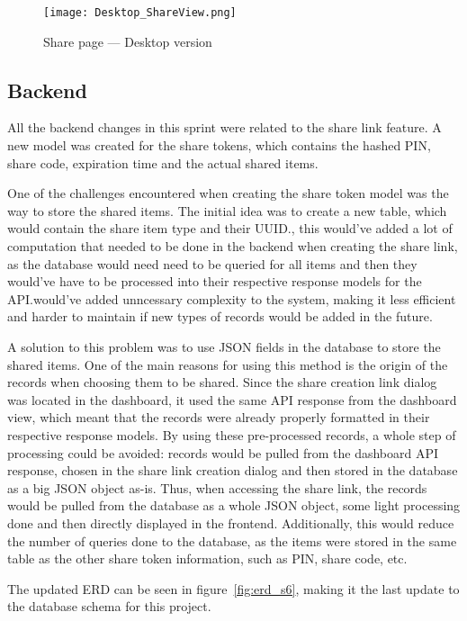 \begin{figure}[htbp]
  \centering
  \texttt{[image: Desktop\_ShareView.png]}
  \caption{Share page --- Desktop version}\label{fig:share_page}
\end{figure}

\FloatBarrier{}

\subsection{Backend}

All the backend changes in this sprint were related to the share link feature. A new model was created for the share tokens, which contains the hashed PIN, share code, expiration time and the actual shared items. 

One of the challenges encountered when creating the share token model was the way to store the shared items. The initial idea was to create a new table, which would contain the share item type and their UUID.\@However, this would've added a lot of computation that needed to be done in the backend when creating the share link, as the database would need need to be queried for all items and then they would've have to be processed into their respective response models for the API.\@This would've added unncessary complexity to the system, making it less efficient and harder to maintain if new types of records would be added in the future.

A solution to this problem was to use JSON fields in the database to store the shared items. One of the main reasons for using this method is the origin of the records when choosing them to be shared. Since the share creation link dialog was located in the dashboard, it used the same API response from the dashboard view, which meant that the records were already properly formatted in their respective response models. By using these pre-processed records, a whole step of processing could be avoided: records would be pulled from the dashboard API response, chosen in the share link creation dialog and then stored in the database as a big JSON object as-is. Thus, when accessing the share link, the records would be pulled from the database as a whole JSON object, some light processing done and then directly displayed in the frontend. Additionally, this would reduce the number of queries done to the database, as the items were stored in the same table as the other share token information, such as PIN, share code, etc. 

The updated ERD can be seen in figure~\ref{fig:erd_s6}, making it the last update to the database schema for this project.

